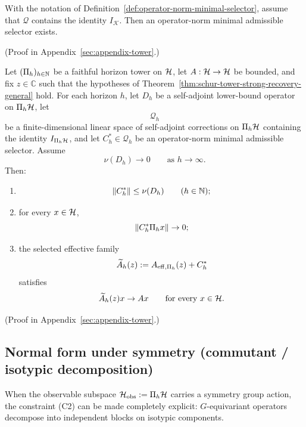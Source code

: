 \begin{proposition}
\label{prop:operator-norm-selector-exists}
With the notation of Definition~\ref{def:operator-norm-minimal-selector},
assume that $\mathcal Q$ contains the identity $I_{\mathcal K}$. Then an
operator-norm minimal admissible selector exists.
\end{proposition}

(Proof in Appendix~\ref{sec:appendix-tower}.)

\begin{theorem}
\label{thm:minimal-selectors-vanish}
Let $(\Pi_{h})_{h\in\mathbb{N}}$ be a faithful horizon tower on $\mathcal{H}$, let
$A:\mathcal{H}\to\mathcal{H}$ be bounded, and fix $z\in\mathbb C$ such that the hypotheses of
Theorem~\ref{thm:schur-tower-strong-recovery-general} hold. For each horizon
$h$, let $D_h$ be a self-adjoint lower-bound operator on $\Pi_{h}\mathcal{H}$, let
\[
\mathcal Q_h
\]
be a finite-dimensional linear space of self-adjoint corrections on
$\Pi_{h}\mathcal{H}$ containing the identity $I_{\Pi_{h}\mathcal{H}}$, and let
$C_h^\ast\in\mathcal Q_h$ be an operator-norm minimal admissible selector.
Assume
\[
\nu(D_h)\to 0
\qquad\text{as }h\to\infty.
\]
Then:
\begin{enumerate}[label=(\roman*), leftmargin=2em, itemsep=0.2em]
\item
      \[
      \|C_h^\ast\|\le \nu(D_h)
      \qquad(h\in\mathbb{N});
      \]
\item for every $x\in\mathcal{H}$,
      \[
      \|C_h^\ast \Pi_{h}x\|\to 0;
      \]
\item the selected effective family
      \[
      \widetilde A_h(z):=A_{\mathrm{eff},\Pi_{h}}(z)+C_h^\ast
      \]
      satisfies
      \[
      \widetilde A_h(z)x\to Ax
      \qquad\text{for every }x\in\mathcal{H}.
      \]
\end{enumerate}
\end{theorem}

(Proof in Appendix~\ref{sec:appendix-tower}.)

\subsection{Normal form under symmetry (commutant / isotypic decomposition)}
\label{subsec:normal-form-symmetry}

When the observable subspace $\mathcal{H}_{\mathrm{obs}} := \Pi_{h} \mathcal{H}$ carries a symmetry group action, the constraint (C2) can be made completely explicit: $G$-equivariant operators decompose into independent blocks on isotypic components.

